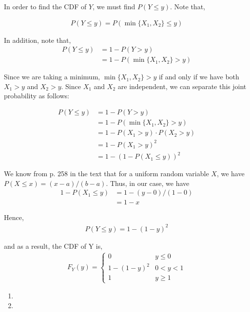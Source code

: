 \documentclass[12pt]{article}
\newenvironment{problem}[2][Problem]{\begin{trivlist}
\item[\hskip \labelsep {\bfseries #1}\hskip \labelsep {\bfseries #2.}]}{\end{trivlist}}
\begin{document}
In order to find the CDF of $Y$, we must find $P(Y \leq y)$. Note that,

\begin{align*}
P(Y \leq y) = P(\min \{X_1, X_2\} \leq y)
\end{align*}

In addition, note that,
\begin{align*}
P(Y \leq y) &= 1 - P(Y > y)\\
&= 1 - P(\min \{X_1, X_2\} > y)
\end{align*}

Since we are taking a minimum, $\min \{X_1, X_2\} > y$ if and only if we have both $X_1 > y$ and $X_2 > y$. Since $X_1$ and $X_2$ are independent, we can separate this joint probability as follows:

\begin{align*}
P(Y \leq y) &= 1 - P(Y > y)\\
&= 1 - P(\min \{X_1, X_2\} > y)\\
&= 1 - P(X_1 > y) \cdot P(X_2 > y)\\
&= 1 - P(X_1 > y)^2\\
&= 1 - (1 - P(X_1 \leq y))^2
\end{align*}

We know from p. 258 in the text that for a uniform random variable $X$, we have $P(X \leq x) = (x - a)/(b - a)$. Thus, in our case, we have
\begin{align*}
1 - P(X_1 \leq y) &= 1 - (y - 0)/(1 - 0)\\
&= 1 - x
\end{align*}

Hence,
\begin{align*}
P(Y \leq y) = 1 - (1 - y)^2
\end{align*}

and as a result, the CDF of Y is,
\begin{align*}
F_Y(y) = \begin{cases} 
      0 & y \leq 0 \\
      1 - (1 - y)^2 & 0 < y < 1 \\
      1 & y \geq 1
   \end{cases}
\end{align*}

\newpage

\begin{problem}{3}
\end{problem}


\begin{problem}{4}
\end{problem}

\begin{enumerate}[(\Alph*)]

\item

\item

\end{enumerate}
\end{document}
